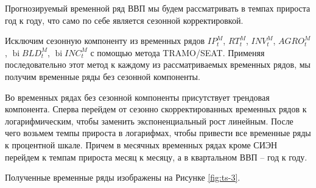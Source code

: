 \documentclass[a4paper, 14pt]{extreport}
\numberwithin{equation}{section}
\newcommand{\bi}{\operatorname{bi}}
\numberwithin{equation}{section}
\begin{document}
	Прогнозируемый временной ряд ВВП мы будем рассматривать в темпах прироста год к году, что само по себе является сезонной корректировкой. 
	
	Исключим сезонную компоненту из временных рядов $IP_t^M$, $RT_t^M$, $INV_t^M$, $AGRO_t^M$, $\bi BLD_t^M$,  $\bi INC_t^M$ с помощью метода TRAMO/SEAT.
	Применяя последовательно этот метод к каждому из рассматриваемых временных рядов, мы получим временные ряды без сезонной компоненты. 
	
	Во временных рядах без сезонной компоненты присутствует трендовая компонента. Сперва перейдем от сезонно скорректированных временных рядов к логарифмическим, чтобы заменить экспоненциальный рост линейным.
	После чего возьмем темпы прироста в логарифмах, чтобы привести все временные ряды к процентной шкале. Причем в месячных временных рядах кроме СИЭН перейдем к темпам прироста месяц к месяцу, а в квартальном ВВП -- год к году. 
	
	Полученные временные ряды изображены на Рисунке \ref{fig:ts-3}. 
	
\end{document}

